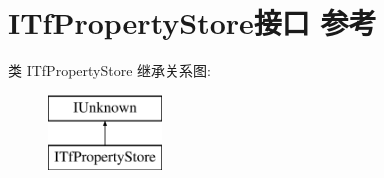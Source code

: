 \hypertarget{interface_i_tf_property_store}{}\section{I\+Tf\+Property\+Store接口 参考}
\label{interface_i_tf_property_store}
类 I\+Tf\+Property\+Store 继承关系图\+:\begin{figure}[H]
\begin{center}
\leavevmode
\includegraphics[height=2.000000cm]{interface_i_tf_property_store}
\end{center}
\end{figure}
